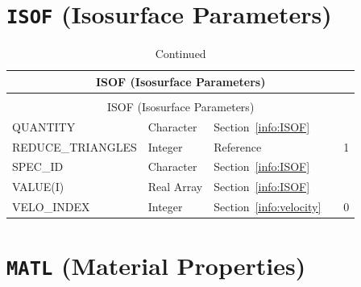 \documentclass[11pt]{book}
\begin{document}
\vspace{\baselineskip}



\section{\texorpdfstring{{\tt ISOF}}{ISOF} (Isosurface Parameters)}


\begin{longtable}{@{\extracolsep{\fill}}|l|l|l|l|l|}
\caption[Isosurface parameters ({\ct ISOF} namelist group)]{For more information see Section~\ref{info:ISOF}.}
\label{tbl:ISOF} \\
\hline
\multicolumn{5}{|c|}{{\ct ISOF} (Isosurface Parameters)} \\
\hline \hline
\endfirsthead
\caption[]{Continued} \\
\hline
\multicolumn{5}{|c|}{{\ct ISOF} (Isosurface Parameters)} \\
\hline \hline
\endhead
{\ct QUANTITY}              & Character     & Section~\ref{info:ISOF}                   &       &         \\ \hline
{\ct REDUCE\_TRIANGLES}     & Integer       & Reference~\cite{Smokeview_Users_Guide}    &       & 1       \\ \hline
{\ct SPEC\_ID}              & Character     & Section~\ref{info:ISOF}                   &       &         \\ \hline
{\ct VALUE(I)}              & Real Array    & Section~\ref{info:ISOF}                   &       &         \\ \hline
{\ct VELO\_INDEX}           & Integer       & Section~\ref{info:velocity}               &       &  0      \\ \hline
\end{longtable}


\vspace{\baselineskip}


\section{\texorpdfstring{{\tt MATL}}{MATL} (Material Properties)}
\end{document}
